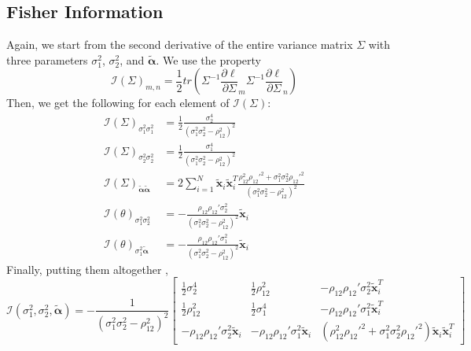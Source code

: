 \documentclass[aap,authoryear, preprint]{imsart}
\numberwithin{equation}{section}
\theoremstyle{plain}
\begin{document}
\subsection*{Fisher Information}
Again, we start from the second derivative of the entire variance matrix $\Sigma$ with three parameters $\sigma_1^2$, $\sigma_2^2$, and $\tilde{\bm{\alpha}}$. We use the property
$$\mathcal{I}(\Sigma)_{m,n}= \frac{1}{2} tr\left(  \Sigma^{-1}\frac{\partial \ell}{\partial \Sigma}_m \Sigma^{-1} \frac{\partial \ell}{\partial \Sigma}_n\right)$$
Then, we get the following for each element of $\mathcal{I}(\Sigma)$:
\begin{align*}
    \mathcal{I}(\Sigma)_{\sigma_1^2 \sigma_1^2} &=
    \frac{1}{2} \frac{\sigma_2^4}{(\sigma_1^2\sigma_2^2 - \rho_{12}^2)^2}\\
    \mathcal{I}(\Sigma)_{\sigma_2^2\sigma_2^2} &=
    \frac{1}{2} \frac{\sigma_1^4}{(\sigma_1^2\sigma_2^2 - \rho_{12}^2)^2}\\
    \mathcal{I}(\Sigma)_{\tilde{\bm{\alpha}}\tilde{\bm{\alpha}}}& = 2\sum_{i=1}^{N} \bm{\tilde{x}}_i \bm{\tilde{x}}_i^T \frac{\rho_{12}^2 \rho_{12}'^2 + \sigma_1^2\sigma_2^2\rho_{12}'^2}{(\sigma_1^2\sigma_2^2 - \rho_{12}^2)^2}\\
    \mathcal{I}(\theta)_{\sigma_1^2\sigma_2^2} &=-\frac{\rho_{12} \rho_{12}'\sigma_2^2}{(\sigma_1^2\sigma_2^2 - \rho_{12}^2)^2}\bm{\tilde{x}}_i\\
    \mathcal{I}(\theta)_{\sigma_1^2\bm{\tilde{\alpha}}} &= -\frac{\rho_{12} \rho_{12}'\sigma_1^2}{(\sigma_1^2\sigma_2^2 - \rho_{12}^2)^2}\bm{\tilde{x}}_i
\end{align*}
Finally, putting them altogether ,
\begin{equation*}
\mathcal{I}(\sigma_1^2, \sigma_2^2, \bm{\tilde{\alpha}}) = -\frac{1}{(\sigma_1^2\sigma_2^2 - \rho_{12}^2)^2}\begin{bmatrix}
\frac{1}{2} \sigma_2^4 & \frac{1}{2} \rho_{12}^2 & -\rho_{12}\rho_{12}'\sigma_2^2 \bm{\tilde{x}}_i^T\\
\frac{1}{2} \rho_{12}^2 & \frac{1}{2} \sigma_1^4 & -\rho_{12} \rho_{12}'\sigma_1^2 \bm{\tilde{x}}_i^T \\
-\rho_{12} \rho_{12}'\sigma_2^2 \bm{\tilde{x}}_i & -\rho_{12} \rho_{12}'\sigma_1^2\bm{\tilde{x}}_i &  (\rho_{12}^2 \rho_{12}'^2 + \sigma_1^2\sigma_2^2 \rho_{12}'^2)\bm{\tilde{x}}_i \bm{\tilde{x}}_i^T
\end{bmatrix}
\end{equation*}
\end{document}
